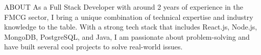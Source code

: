 \documentclass{resume} %
\begin{document}




\begin{rSection}{ABOUT}
As a Full Stack Developer with around 2 years of experience in the FMCG sector, I bring a unique combination of technical expertise and industry knowledge to the table. With a strong tech stack that includes React.js, Node.js, MongoDB, PostgreSQL, and Java, I am passionate about problem-solving and have built several cool projects to solve real-world issues.
\end{rSection}
\end{document}
